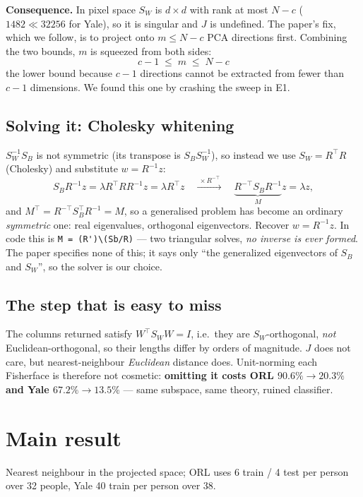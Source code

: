 \documentclass[11pt]{article}
\newcommand{\Sw}{S_W}
\newcommand{\Sb}{S_B}
\begin{document}
\textbf{Consequence.} In pixel space $\Sw$ is $d\times d$ with rank at most
$N-c$ ($1482\ll32256$ for Yale), so it is singular and $J$ is undefined. The
paper's fix, which we follow, is to project onto $m\le N-c$ PCA directions
first. Combining the two bounds, $m$ is squeezed from both sides:
\[
  \boxed{\;c-1\;\le\;m\;\le\;N-c\;}
\]
the lower bound because $c-1$ directions cannot be extracted from fewer than
$c-1$ dimensions. We found this one by crashing the sweep in E1.

\subsection{Solving it: Cholesky whitening}

$\Sw^{-1}\Sb$ is not symmetric (its transpose is $\Sb\Sw^{-1}$), so instead we
use $\Sw=R^{\!\top}R$ (Cholesky) and substitute $w=R^{-1}z$:
\[
  \Sb R^{-1}z=\lambda R^{\!\top}RR^{-1}z=\lambda R^{\!\top}z
  \quad\xrightarrow{\ \times R^{-\top}\ }\quad
  \underbrace{R^{-\top}\Sb R^{-1}}_{M}z=\lambda z,
\]
and $M^{\!\top}=R^{-\top}\Sb^{\!\top}R^{-1}=M$, so a generalised problem has
become an ordinary \emph{symmetric} one: real eigenvalues, orthogonal
eigenvectors. Recover $w=R^{-1}z$. In code this is
\verb|M = (R')\(Sb/R)| --- two triangular solves, \emph{no inverse is ever
formed}. The paper specifies none of this; it says only ``the generalized
eigenvectors of $\Sb$ and $\Sw$'', so the solver is our choice.

\subsection{The step that is easy to miss}
\label{sec:unitnorm}

The columns returned satisfy $W^{\!\top}\Sw W=I$, i.e.\ they are
$\Sw$-orthogonal, \emph{not} Euclidean-orthogonal, so their lengths differ by
orders of magnitude. $J$ does not care, but nearest-neighbour \emph{Euclidean}
distance does. Unit-norming each Fisherface is therefore not cosmetic:
\textbf{omitting it costs ORL $90.6\%\to20.3\%$ and Yale $67.2\%\to13.5\%$} ---
same subspace, same theory, ruined classifier.

\section{Main result}

Nearest neighbour in the projected space; ORL uses 6 train / 4 test per person
over 32 people, Yale 40 train per person over 38.
\end{document}
